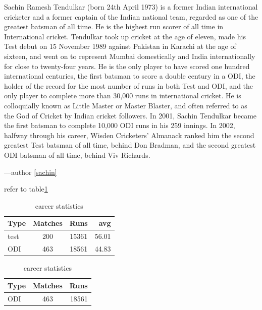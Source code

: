 \documentclass{article}
\begin{document}
	
	Sachin Ramesh Tendulkar (born 24th April 1973) is a former Indian international cricketer and a former captain of the Indian national team, regarded as one of the greatest batsman of all time. He is the highest run scorer of all time in International cricket. Tendulkar took up cricket at the age of eleven, made his Test debut on 15 November 1989 against Pakistan in Karachi at the age of sixteen, and went on to represent Mumbai domestically and India internationally for close to twenty-four years. He is the only player to have scored one hundred international centuries, the first batsman to score a double century in a ODI, the holder of the record for the most number of runs in both Test and ODI, and the only player to complete more than 30,000 runs in international cricket. He is colloquially known as Little Master or Master Blaster, and often referred to as the God of Cricket by Indian cricket followers. In 2001, Sachin Tendulkar became the first batsman to complete 10,000 ODI runs in his 259 innings. In 2002, halfway through his career, Wisden Cricketers' Almanack ranked him the second greatest Test batsman of all time, behind Don Bradman, and the second greatest ODI batsman of all time, behind Viv Richards.
	
	\hfill---author
	\ref{sachin}
	
	refer to table\ref{cs1}\\
	
	\begin{table}[h]
	\centering
	\begin{tabular}{|l|c|c|r|}
		\hline
		\textbf{Type}&\textbf{Matches}&\textbf{Runs}&\textbf{avg}\\
		\hline
		\hline
		test& 200 & 15361 & 56.01\\
		\hline
		ODI & 463 & 18561 & 44.83\\
		\hline
	\end{tabular}
	\caption{career statistics}
	\end{table}

	\begin{table}
	\centering
	\label{cs1}
	\begin{tabular}{|l|c|r|}
		\hline
		\textbf{Type}&\textbf{Matches}&\textbf{Runs}\\
		\hline
		\hline
		ODI & 463 & 18561\\
		\hline
	\end{tabular}
	\caption{career statistics}
	\end{table}
\end{document}
